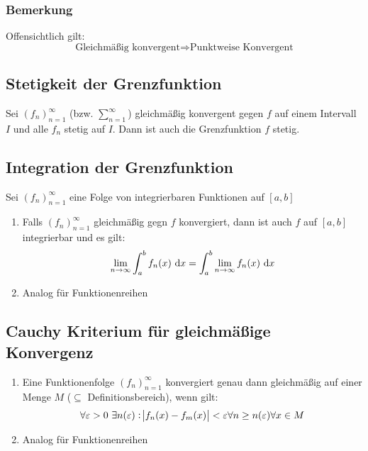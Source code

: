 \subsubsection{Bemerkung}
Offensichtlich gilt:
\begin{equation*}
    \text{Gleichmäßig konvergent} \Rightarrow \text{Punktweise Konvergent}
\end{equation*}


\subsection{Stetigkeit der Grenzfunktion}
Sei ${(f_n)}_{n=1}^\infty$ (bzw. $\sum_{n=1}^\infty$) gleichmäßig konvergent gegen
$f$ auf einem Intervall $I$ und alle $f_n$ stetig auf $I$. Dann ist auch die
Grenzfunktion $f$ stetig.

\subsection{Integration der Grenzfunktion}
Sei ${(f_n)}_{n=1}^\infty$ eine Folge von integrierbaren Funktionen auf $[a,b]$
\begin{enumerate}[label= (\alph*)]
    \item Falls ${(f_n)}_{n=1}^\infty$ gleichmäßig gegn $f$ konvergiert, dann ist
    auch $f$ auf $[a,b]$ integrierbar und es gilt:
        \begin{equation*}
            \lim_{n \rightarrow \infty} \int_a^b f_n(x) \text{ d}x =
            \int_a^b \lim_{n \rightarrow \infty} f_n(x) \text{ d}x
        \end{equation*}
    \item Analog für Funktionenreihen
\end{enumerate}

\subsection{Cauchy Kriterium für gleichmäßige Konvergenz}
\begin{enumerate}[label= (\alph*)]
    \item Eine Funktionenfolge ${(f_n)}_{n=1}^\infty$ konvergiert genau dann
        gleichmäßig auf einer Menge $M$ ($\subseteq$ Definitionsbereich), wenn
        gilt:
        \begin{equation*}
            \forall \varepsilon > 0\ \exists n(\varepsilon):
            \abs{f_n(x) - f_m(x)} < \varepsilon \forall n \geq n(\varepsilon) \forall x \in M
        \end{equation*}
    \item Analog für Funktionenreihen
\end{enumerate}

